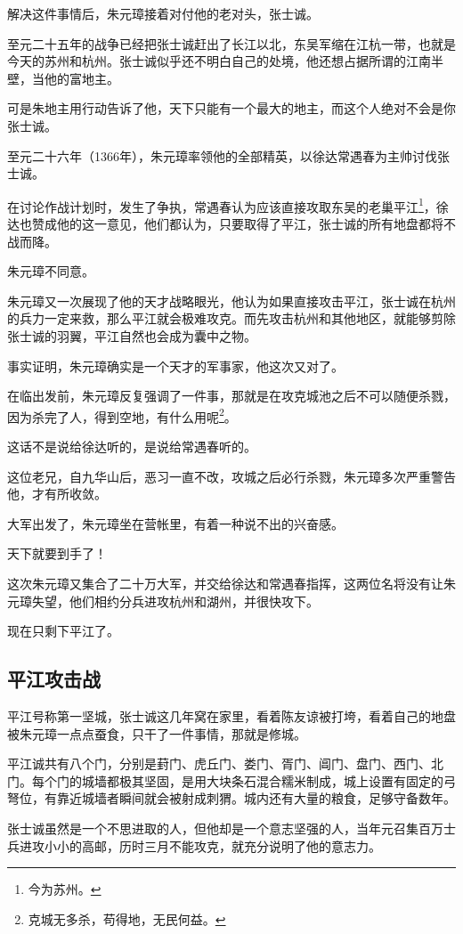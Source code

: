 \begin{multicols}{\theparacolNo}
		解决这件事情后，朱元璋接着对付他的老对头，张士诚。

		至元二十五年的战争已经把张士诚赶出了长江以北，东吴军缩在江杭一带，也就是今天的苏州和杭州。张士诚似乎还不明白自己的处境，他还想占据所谓的江南半壁，当他的富地主。

		可是朱地主用行动告诉了他，天下只能有一个最大的地主，而这个人绝对不会是你张士诚。

		至元二十六年（1366年），朱元璋率领他的全部精英，以徐达常遇春为主帅讨伐张士诚。

		在讨论作战计划时，发生了争执，常遇春认为应该直接攻取东吴的老巢平江\footnote{今为苏州。}，徐达也赞成他的这一意见，他们都认为，只要取得了平江，张士诚的所有地盘都将不战而降。

		朱元璋不同意。

		朱元璋又一次展现了他的天才战略眼光，他认为如果直接攻击平江，张士诚在杭州的兵力一定来救，那么平江就会极难攻克。而先攻击杭州和其他地区，就能够剪除张士诚的羽翼，平江自然也会成为囊中之物。

		事实证明，朱元璋确实是一个天才的军事家，他这次又对了。

		在临出发前，朱元璋反复强调了一件事，那就是在攻克城池之后不可以随便杀戮，因为杀完了人，得到空地，有什么用呢\footnote{克城无多杀，苟得地，无民何益。}。

		这话不是说给徐达听的，是说给常遇春听的。

		这位老兄，自九华山后，恶习一直不改，攻城之后必行杀戮，朱元璋多次严重警告他，才有所收敛。

		大军出发了，朱元璋坐在营帐里，有着一种说不出的兴奋感。

		天下就要到手了！

		这次朱元璋又集合了二十万大军，并交给徐达和常遇春指挥，这两位名将没有让朱元璋失望，他们相约分兵进攻杭州和湖州，并很快攻下。

		现在只剩下平江了。

		\subsection{平江攻击战}
		平江号称第一坚城，张士诚这几年窝在家里，看着陈友谅被打垮，看着自己的地盘被朱元璋一点点蚕食，只干了一件事情，那就是修城。

		平江诚共有八个门，分别是葑门、虎丘门、娄门、胥门、阊门、盘门、西门、北门。每个门的城墙都极其坚固，是用大块条石混合糯米制成，城上设置有固定的弓弩位，有靠近城墙者瞬间就会被射成刺猬。城内还有大量的粮食，足够守备数年。

		张士诚虽然是一个不思进取的人，但他却是一个意志坚强的人，当年元召集百万士兵进攻小小的高邮，历时三月不能攻克，就充分说明了他的意志力。


\end{multicols}
